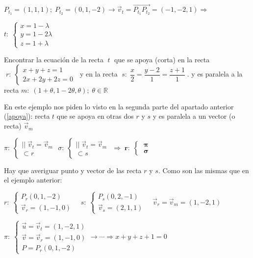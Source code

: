 \noindent \textcolor{gris}{$P_{t_1}=(1,1,1); \; P_{t_2}=(0,1,-2) \to \vec v_t=\overrightarrow{P_{t_1}P_{t_2}}=(-1,-2,1) \Rightarrow$} 

\noindent \textcolor{gris}{$ t:\; \begin{cases} x=1-\lambda\\y=1-2\lambda\\z=1+\lambda \end{cases}$}

\begin{ejem}
Encontrar la ecuación de la recta $\;t\;$ que  se apoya (corta) en la recta $\;r:\; \begin{cases} x+y+z=1\\2x+2y+2z=0 \end{cases}\;$ y en la recta $\;s:\; \dfrac{x}{2}=\dfrac{y-2}{1}=\dfrac{z+1}{1}\;$. y es paralela a la recta $m: \; (1+\theta, 1-2\theta,\theta); \; \theta \in \mathbb R$  
\end{ejem}

En este ejemplo nos piden lo visto en la segunda parte del apartado anterior (\ref{apoya}):
 recta $t$ que se apoya en otras dos $r$ y $s$ y es paralela a un vector (o recta) $\vec v_m$

$\pi:\; \begin{cases} ||\;\vec v_t=\vec v_m \\ \subset r \end{cases}$
$\sigma:\; \begin{cases} ||\;\vec v_t=\vec v_m \\ \subset s \end{cases}$
$ \Rightarrow \; \boldsymbol{r:\; \begin{cases}\; \pi \\ \; \sigma \end{cases}}$

Hay que averiguar punto y vector de las recta $r$ y $s$. Como son las mismas que en el ejemplo anterior:

$r:\;\begin{cases} P_r(0,1,-2) \\ \vec v_r=(1,-1,0) \end{cases} \quad 	
s:\; \begin{cases} P_s(0,2,-1) \\ \vec v_s=(2,1,1) \end{cases} \quad \vec v_r=\vec v_m=(1,-2,1)$

$\pi:\; \begin{cases} \vec u=\vec v_t=(1,-2,1) \\ \vec v=\vec v_r=(1,-1,0) \\ P=P_r(0,1,-2) \end{cases} \to \cdots \Rightarrow x+y+z+1=0$

